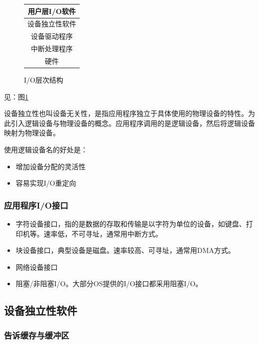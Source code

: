 \documentclass[12pt, a4paper, oneside]{ctexart}
\begin{document}
\begin{figure}
  \centering
  \begin{tabular}{|c|}
    \hline
    用户层I/O软件 \\ \hline
    设备独立性软件 \\ \hline
    设备驱动程序 \\ \hline
    中断处理程序 \\ \hline
    硬件 \\ \hline
  \end{tabular}
  \caption{I/O层次结构}
  \label{io-layer}
\end{figure}

见：图\ref{io-layer}

设备独立性也叫设备无关性，是指应用程序独立于具体使用的物理设备的特性。为此引入逻辑设备与物理设备的概念。应用程序调用的是逻辑设备，然后将逻辑设备映射为物理设备。

使用逻辑设备名的好处是：
\begin{itemize}
  \item 增加设备分配的灵活性
  \item 容易实现I/O重定向
\end{itemize}

\subsubsection{应用程序I/O接口}

\begin{itemize}
  \item 字符设备接口，指的是数据的存取和传输是以字符为单位的设备，如键盘、打印机等。速率低，不可寻址，通常用中断方式。
  \item 块设备接口，典型设备是磁盘。速率较高、可寻址，通常用DMA方式。
  \item 网络设备接口
  \item 阻塞/非阻塞I/O。大部分OS提供的I/O接口都采用阻塞I/O。
\end{itemize}

\subsection{设备独立性软件}

\subsubsection{告诉缓存与缓冲区}
\end{document}
